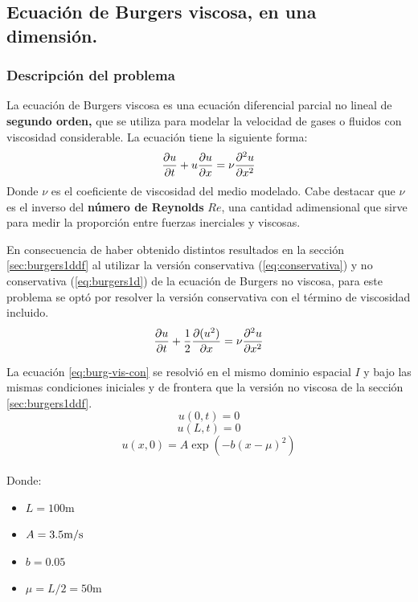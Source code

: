 \documentclass[12pt]{article}
\newcommand{\mpers}{\unit[per-mode = symbol]{\metre\per\second}}
\begin{document}
	\newpage
	\subsection{Ecuación de Burgers viscosa, en una dimensión.}
	\label{sec:burg-vis1ddf}
	\subsubsection{Descripción del problema}
	La ecuación de Burgers viscosa es una ecuación diferencial parcial no lineal de \textbf{segundo orden,} que se utiliza para modelar la velocidad de gases o fluidos con viscosidad considerable. La ecuación tiene la siguiente forma:
	\begin{equation}
		\pdv{u}{t}+u\pdv{u}{x}=\nu \pdv{^2 u}{x^2}
		\label{eq:burg-vis}
	\end{equation}
	Donde $\nu$ es el coeficiente de viscosidad del medio modelado. Cabe destacar que $\nu$ es el inverso del \textbf{número de Reynolds} $Re$, una cantidad adimensional que sirve para medir la proporción entre fuerzas inerciales y viscosas. 

	En consecuencia de haber obtenido distintos resultados en la sección \ref{sec:burgers1ddf} al utilizar la versión conservativa (\ref{eq:conservativa}) y no conservativa (\ref{eq:burgers1d}) de la ecuación de Burgers no viscosa, para este problema se optó por resolver la versión conservativa con el término de viscosidad incluido.
	\begin{equation}
		\pdv{u}{t}+\frac{1}{2}\pdv{(u^2)}{x}=\nu \pdv{^2 u}{x^2}
		\label{eq:burg-vis-con}
	\end{equation}
	
 	La ecuación \ref{eq:burg-vis-con} se resolvió en el mismo dominio espacial $I$ y bajo las mismas condiciones iniciales y de frontera que la versión no viscosa de la sección \ref{sec:burgers1ddf}. 
 	\begin{equation}
 		u(0,t)=0
 	\end{equation}
 	\begin{equation}
 		u(L,t)= 0
 	\end{equation}
	\begin{equation}
		u(x,0) = A\exp(-b(x-\mu)^{2})
		\label{eq:condinicial-vis}
	\end{equation}
	\\
	Donde:
	\begin{itemize}
		\item $L = 100\unit{\meter}$
		\item $A=3.5\mpers$
		\item $b=0.05$
		\item $\mu=L/2=50\unit{\meter}$
	\end{itemize}
	
\end{document}
